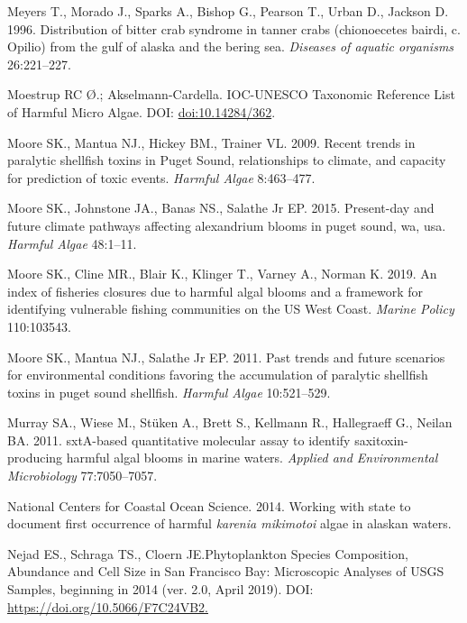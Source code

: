 \documentclass[
]{article}
\begin{document}
\leavevmode\hypertarget{ref-meyers1996distribution}{}%
Meyers T., Morado J., Sparks A., Bishop G., Pearson T., Urban D.,
Jackson D. 1996. Distribution of bitter crab syndrome in tanner crabs
(chionoecetes bairdi, c. Opilio) from the gulf of alaska and the bering
sea. \emph{Diseases of aquatic organisms} 26:221--227.

\leavevmode\hypertarget{ref-UNESCO}{}%
Moestrup RC Ø.; Akselmann-Cardella. IOC-UNESCO Taxonomic Reference List
of Harmful Micro Algae. DOI:
\href{https://doi.org/doi:10.14284/362}{doi:10.14284/362}.

\leavevmode\hypertarget{ref-moore2009recent}{}%
Moore SK., Mantua NJ., Hickey BM., Trainer VL. 2009. Recent trends in
paralytic shellfish toxins in Puget Sound, relationships to climate, and
capacity for prediction of toxic events. \emph{Harmful Algae}
8:463--477.

\leavevmode\hypertarget{ref-moore2015present}{}%
Moore SK., Johnstone JA., Banas NS., Salathe Jr EP. 2015. Present-day
and future climate pathways affecting alexandrium blooms in puget sound,
wa, usa. \emph{Harmful Algae} 48:1--11.

\leavevmode\hypertarget{ref-moore2019index}{}%
Moore SK., Cline MR., Blair K., Klinger T., Varney A., Norman K. 2019.
An index of fisheries closures due to harmful algal blooms and a
framework for identifying vulnerable fishing communities on the US West
Coast. \emph{Marine Policy} 110:103543.

\leavevmode\hypertarget{ref-moore2011past}{}%
Moore SK., Mantua NJ., Salathe Jr EP. 2011. Past trends and future
scenarios for environmental conditions favoring the accumulation of
paralytic shellfish toxins in puget sound shellfish. \emph{Harmful
Algae} 10:521--529.

\leavevmode\hypertarget{ref-murray2011sxta}{}%
Murray SA., Wiese M., Stüken A., Brett S., Kellmann R., Hallegraeff G.,
Neilan BA. 2011. sxtA-based quantitative molecular assay to identify
saxitoxin-producing harmful algal blooms in marine waters. \emph{Applied
and Environmental Microbiology} 77:7050--7057.

\leavevmode\hypertarget{ref-workingwithstate2014}{}%
National Centers for Coastal Ocean Science. 2014. Working with state to
document first occurrence of harmful \emph{karenia mikimotoi} algae in
alaskan waters.

\leavevmode\hypertarget{ref-usgs2019phytoplankton}{}%
Nejad ES., Schraga TS., Cloern JE.Phytoplankton Species Composition,
Abundance and Cell Size in San Francisco Bay: Microscopic Analyses of
USGS Samples, beginning in 2014 (ver. 2.0, April 2019). DOI:
\href{https://doi.org/https://doi.org/10.5066/F7C24VB2.}{https://doi.org/10.5066/F7C24VB2.}
\end{document}
